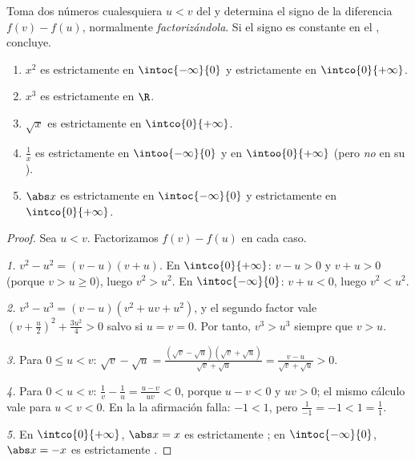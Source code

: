 \begin{method}\label{met:g11:func:variation}
Toma dos números cualesquiera $u < v$ del  y determina el signo
de la diferencia $f(v) - f(u)$, normalmente \emph{factorizándola}. Si el
signo es constante en el , concluye.
\end{method}

\begin{proposition}\label{prop:g11:func:refvariations}
\begin{enumerate}
  \item $x^2$ es estrictamente  en $\intoc{-\infty}{0}$ y
        estrictamente  en $\intco{0}{+\infty}$.
  \item $x^3$ es estrictamente  en $\R$.
  \item $\sqrt x$ es estrictamente  en $\intco{0}{+\infty}$.
  \item $\frac1x$ es estrictamente  en $\intoo{-\infty}{0}$ y
        en $\intoo{0}{+\infty}$ (pero \emph{no} en su ).
  \item $\abs x$ es estrictamente  en $\intoc{-\infty}{0}$ y
        estrictamente  en $\intco{0}{+\infty}$.
\end{enumerate}
\end{proposition}

\begin{proof}
Sea $u < v$. Factorizamos $f(v) - f(u)$ en cada caso.

\emph{1.} $v^2 - u^2 = (v-u)(v+u)$. En $\intco{0}{+\infty}$: $v - u > 0$ y
$v + u > 0$ (porque $v > u \geq 0$), luego $v^2 > u^2$. En
$\intoc{-\infty}{0}$: $v + u < 0$, luego $v^2 < u^2$.

\emph{2.} $v^3 - u^3 = (v - u)(v^2 + uv + u^2)$, y el segundo factor vale
$\left(v + \frac u2\right)^2 + \frac{3u^2}{4} > 0$ salvo si
$u = v = 0$. Por tanto, $v^3 > u^3$ siempre que $v > u$.

\emph{3.} Para $0 \leq u < v$:
$\sqrt v - \sqrt u = \frac{(\sqrt v - \sqrt u)(\sqrt v + \sqrt u)}
{\sqrt v + \sqrt u} = \frac{v - u}{\sqrt v + \sqrt u} > 0$.

\emph{4.} Para $0 < u < v$: $\frac1v - \frac1u = \frac{u - v}{uv} < 0$,
porque $u - v < 0$ y $uv > 0$; el mismo cálculo vale para $u < v < 0$. En
la  la afirmación falla: $-1 < 1$, pero $\frac{1}{-1} = -1 < 1 =
\frac11$.

\emph{5.} En $\intco{0}{+\infty}$, $\abs x = x$ es estrictamente
; en $\intoc{-\infty}{0}$, $\abs x = -x$ es estrictamente
.
\end{proof}

